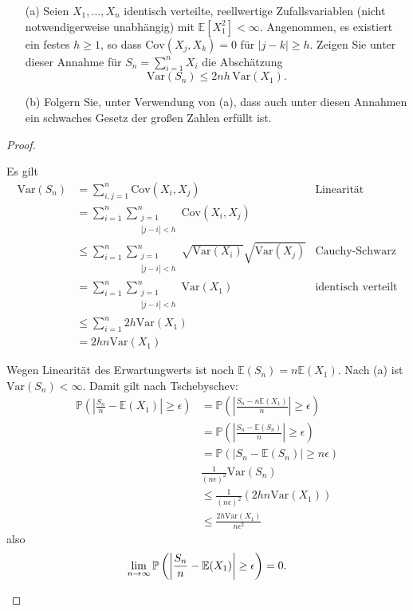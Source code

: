 \begin{Problem}
	\begin{enumerate}
		\item[(a)] Seien \( X_1, \dots, X_n \) identisch verteilte, reellwertige Zufallsvariablen (nicht notwendigerweise unabhängig) mit \( \mathbb{E}[X_1^2] < \infty \). Angenommen, es existiert ein festes \( h \geq 1 \), so dass \(\text{Cov}(X_j, X_k) = 0\) für \( |j - k| \geq h \). Zeigen Sie unter dieser Annahme für \( S_n = \sum_{i=1}^{n} X_i \) die Abschätzung
		\[
		\text{Var}(S_n) \leq 2nh \, \text{Var}(X_1).
		\]
		
		\item[(b)] Folgern Sie, unter Verwendung von (a), dass auch unter diesen Annahmen ein schwaches Gesetz der großen Zahlen erfüllt ist.
	\end{enumerate}
	
\end{Problem}
\begin{proof}
	\begin{parts}
	\item Es gilt
		\begin{align*}
			\text{Var}(S_n)&= \sum_{i,j=1}^n \text{Cov}(X_i, X_j) & \text{Linearität}\\
				       &=\sum_{i=1}^n \sum_{\substack{j=1\\|j-i|<h}}^n \text{Cov}(X_i, X_j)\\
				       &\le\sum_{i=1}^n \sum_{\substack{j=1\\|j-i|<h}}^n \sqrt{\text{Var}(X_i)}\sqrt{\text{Var}(X_j)} &\text{Cauchy-Schwarz} \\
				       &=\sum_{i=1}^n \sum_{\substack{j=1\\|j-i|<h}}^n \text{Var}(X_1) & \text{identisch verteilt}\\
				       &\le \sum_{i=1}^n 2h \text{Var}(X_1)\\
			&= 2hn\text{Var}(X_1)
		\end{align*}
	\item Wegen Linearität des Erwartungwerts ist noch $\mathbb{E}(S_n) = n \mathbb{E}(X_1)$. Nach (a) ist $\text{Var}(S_n)<\infty$. Damit gilt nach Tschebyschev:
		\begin{align*}
			\mathbb{P}\left( \left| \frac{S_n}{n}-\mathbb{E}(X_1) \right|  \ge\epsilon \right) &= \mathbb{P}\left( \left| \frac{S_n - n \mathbb{E}(X_1)}{n} \right| \ge \epsilon \right) \\
													   &= \mathbb{P}\left( \left| \frac{S_n - \mathbb{E}(S_n)}{n} \right| \ge\epsilon \right) \\
													   &= \mathbb{P}\left( |S_n - \mathbb{E}(S_n)| \ge n\epsilon \right) \\
													   &\frac{1}{(n\epsilon)^2}\text{Var}(S_n)\\
													   &\le \frac{1}{(n\epsilon)^2}(2hn\text{Var}(X_1))\\
													   &\le \frac{2h\text{Var}(X_1)}{n\epsilon^2}
		\end{align*}
		also
		\[
		\lim_{n \to \infty} 	\mathbb{P}\left( \left| \frac{S_n}{n}-\mathbb{E}(X_1) \right|  \ge\epsilon \right) = 0
		.\qedhere\] 
	\end{parts}
\end{proof}
